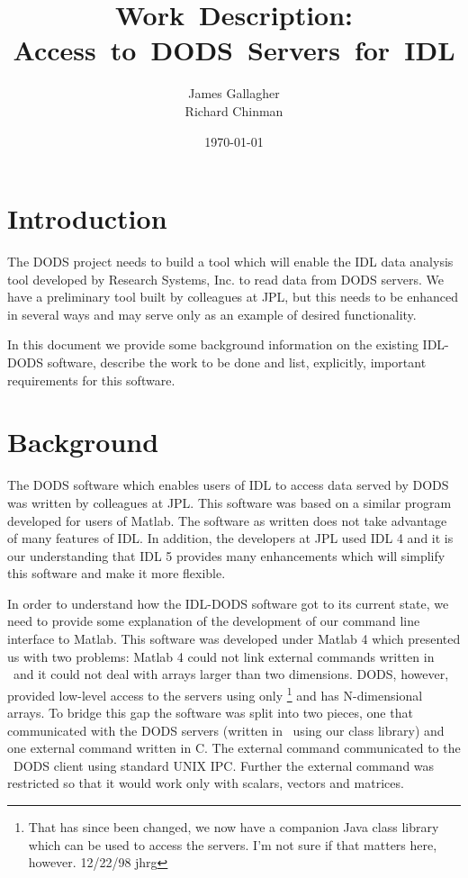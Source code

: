 \documentclass[12pt]{article}
\begin{document}
\title{Work~Description: Access~to~DODS~Servers~for~IDL}
\author{James Gallagher\\
Richard Chinman}
\date{\today}

\maketitle

\begin{htmlonly}
\end{htmlonly}

\section{Introduction}

The DODS project needs to build a tool which will enable the IDL data
analysis tool developed by Research Systems, Inc. to read data from DODS
servers. We have a preliminary tool built by colleagues at JPL, but this needs
to be enhanced in several ways and may serve only as an example of desired
functionality. 

In this document we provide some background information on the existing
IDL-DODS software, describe the work to be done and list, explicitly,
important requirements for this software.

\section{Background}

The DODS software which enables users of IDL to access data served by DODS
was written by colleagues at JPL. This software was based on a similar
program developed for users of Matlab. The software as written does not take
advantage of many features of IDL. In addition, the developers at JPL used
IDL 4 and it is our understanding that IDL 5 provides many enhancements which
will simplify this software and make it more flexible.

In order to understand how the IDL-DODS software got to its current state, we
need to provide some explanation of the development of our command line
interface to Matlab. This software was developed under Matlab 4 which
presented us with two problems: Matlab 4 could not link external commands
written in \Cpp\ and it could not deal with arrays larger than two
dimensions.  DODS, however, provided low-level access to the servers using
only \Cpp \footnote{That has since been changed, we now have a companion Java
  class library which can be used to access the servers. I'm not sure if that
  matters here, however. 12/22/98 jhrg} and has N-dimensional arrays. To
bridge this gap the software was split into two pieces, one that communicated
with the DODS servers (written in \Cpp\, using our class library) and one
external command written in C. The external command communicated to the \Cpp\ 
DODS client using standard UNIX IPC. Further the external command was
restricted so that it would work only with scalars, vectors and matrices.
\end{document}
